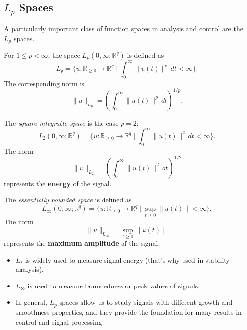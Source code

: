 \subsection{$L_p$ Spaces}

A particularly important class of function spaces in analysis and control are the $L_p$ spaces.

\begin{definition}[$L_p$ space]
For $1 \leq p < \infty$, the space $L_p(0,\infty;\mathbb{R}^q)$ is defined as
\begin{equation}
L_p = \Big\{ u:\mathbb{R}_{\geq 0}\to \mathbb{R}^q \;\Big|\;
\int_{0}^{\infty} \|u(t)\|^p \, dt < \infty \Big\}.
\end{equation}
The corresponding norm is
\begin{equation}
\|u\|_{L_p} = \left( \int_{0}^{\infty} \|u(t)\|^p \, dt \right)^{1/p}.
\end{equation}
\end{definition}

\begin{definition}[$L_2$ space]
The \emph{square-integrable space} is the case $p=2$:
\begin{equation}
L_2(0,\infty;\mathbb{R}^q) 
= \Big\{ u:\mathbb{R}_{\geq 0}\to \mathbb{R}^q \;\Big|\;
\int_{0}^{\infty} \|u(t)\|^2 \, dt < \infty \Big\}.
\end{equation}
The norm
\begin{equation}
\|u\|_{L_2} = \left( \int_{0}^{\infty} \|u(t)\|^2 \, dt \right)^{1/2}
\end{equation}
represents the \textbf{energy} of the signal.
\end{definition}

\begin{definition}
The \emph{essentially bounded space} is defined as
\begin{equation}
L_\infty(0,\infty;\mathbb{R}^q) 
= \Big\{ u:\mathbb{R}_{\geq 0}\to \mathbb{R}^q \;\Big|\;
\sup_{t \geq 0} \|u(t)\| < \infty \Big\}.
\end{equation}
The norm
\begin{equation}
\|u\|_{L_\infty} = \sup_{t \geq 0} \|u(t)\|
\end{equation}
represents the \textbf{maximum amplitude} of the signal.
\end{definition}

\begin{remark}
\begin{itemize}
\item  $L_2$ is widely used to measure signal energy (that's why used in stability analysis).  
\item  $L_\infty$ is used to measure boundedness or peak values of signals.  
\item  In general, $L_p$ spaces allow us to study signals with different growth and smoothness properties, and they provide the foundation for many results in control and signal processing.
\end{itemize}
\end{remark}


